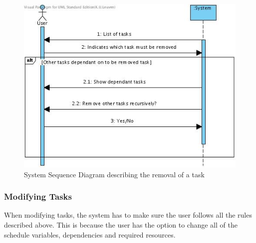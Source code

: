 			\begin{figure}[H]
				\begin{center}
					\includegraphics[scale=0.5]{images/ssd_remove_task.jpg}
				\end{center}
				\caption{System Sequence Diagram describing the removal of a task}
			\end{figure}
			\subsubsection{Modifying Tasks}
			When modifying tasks, the system has to make sure the user follows all the rules described above. This is because the user has the option to change all of the schedule variables, dependencies and required resources.

